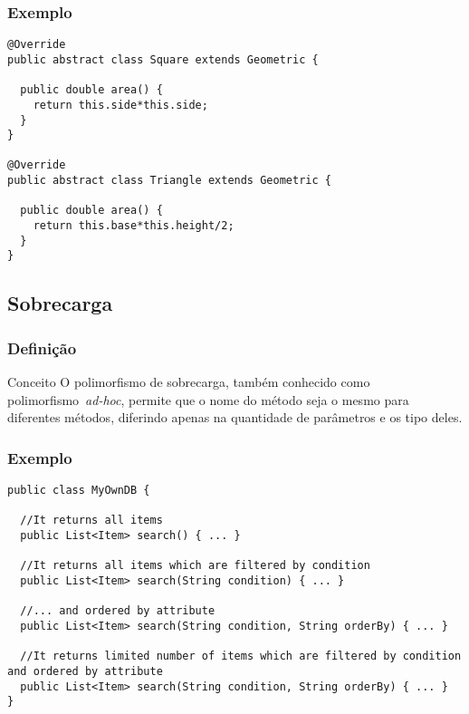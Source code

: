 \begin{frame}[fragile]
\frametitle{Exemplo}
\justifying
\begin{lstlisting}
@Override
public abstract class Square extends Geometric {
	
  public double area() {
    return this.side*this.side;
  }
}

@Override
public abstract class Triangle extends Geometric {
	
  public double area() {
    return this.base*this.height/2;
  }
}
\end{lstlisting}
\end{frame}

\subsection{Sobrecarga}

\begin{frame}
\frametitle{Definição}
\justifying
\begin{block}{Conceito}
\qquad O polimorfismo de sobrecarga, também conhecido como polimorfismo~\emph{ad-hoc}, permite que o nome do método seja o mesmo para diferentes métodos, diferindo apenas na quantidade de parâmetros e os tipo deles.
\end{block}
\end{frame}

\begin{frame}[fragile]
\frametitle{Exemplo}
\justifying
\begin{lstlisting}
public class MyOwnDB {
	
  //It returns all items
  public List<Item> search() { ... } 

  //It returns all items which are filtered by condition
  public List<Item> search(String condition) { ... } 
  
  //... and ordered by attribute
  public List<Item> search(String condition, String orderBy) { ... } 
  
  //It returns limited number of items which are filtered by condition and ordered by attribute
  public List<Item> search(String condition, String orderBy) { ... } 
}
\end{lstlisting}
\end{frame}

